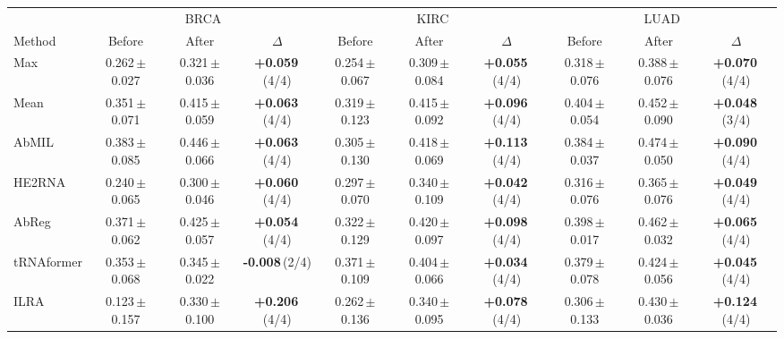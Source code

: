 \begin{tabular}{lccccccccc}
\toprule
& \multicolumn{3}{c}{BRCA} & \multicolumn{3}{c}{KIRC} & \multicolumn{3}{c}{LUAD}\\
\cmidrule(lr){2-4}\cmidrule(lr){5-7}\cmidrule(lr){8-10}
Method & Before & After & $\Delta$ & Before & After & $\Delta$ & Before & After & $\Delta$\\
\midrule
Max & 0.262\,{\tiny$\pm$0.027} & 0.321\,{\tiny$\pm$0.036} & \textbf{+0.059}\,{\tiny(4/4)} & 0.254\,{\tiny$\pm$0.067} & 0.309\,{\tiny$\pm$0.084} & \textbf{+0.055}\,{\tiny(4/4)} & 0.318\,{\tiny$\pm$0.076} & 0.388\,{\tiny$\pm$0.076} & \textbf{+0.070}\,{\tiny(4/4)}\\
Mean & 0.351\,{\tiny$\pm$0.071} & 0.415\,{\tiny$\pm$0.059} & \textbf{+0.063}\,{\tiny(4/4)} & 0.319\,{\tiny$\pm$0.123} & 0.415\,{\tiny$\pm$0.092} & \textbf{+0.096}\,{\tiny(4/4)} & 0.404\,{\tiny$\pm$0.054} & 0.452\,{\tiny$\pm$0.090} & \textbf{+0.048}\,{\tiny(3/4)}\\
AbMIL & 0.383\,{\tiny$\pm$0.085} & 0.446\,{\tiny$\pm$0.066} & \textbf{+0.063}\,{\tiny(4/4)} & 0.305\,{\tiny$\pm$0.130} & 0.418\,{\tiny$\pm$0.069} & \textbf{+0.113}\,{\tiny(4/4)} & 0.384\,{\tiny$\pm$0.037} & 0.474\,{\tiny$\pm$0.050} & \textbf{+0.090}\,{\tiny(4/4)}\\
HE2RNA & 0.240\,{\tiny$\pm$0.065} & 0.300\,{\tiny$\pm$0.046} & \textbf{+0.060}\,{\tiny(4/4)} & 0.297\,{\tiny$\pm$0.070} & 0.340\,{\tiny$\pm$0.109} & \textbf{+0.042}\,{\tiny(4/4)} & 0.316\,{\tiny$\pm$0.076} & 0.365\,{\tiny$\pm$0.076} & \textbf{+0.049}\,{\tiny(4/4)}\\
AbReg & 0.371\,{\tiny$\pm$0.062} & 0.425\,{\tiny$\pm$0.057} & \textbf{+0.054}\,{\tiny(4/4)} & 0.322\,{\tiny$\pm$0.129} & 0.420\,{\tiny$\pm$0.097} & \textbf{+0.098}\,{\tiny(4/4)} & 0.398\,{\tiny$\pm$0.017} & 0.462\,{\tiny$\pm$0.032} & \textbf{+0.065}\,{\tiny(4/4)}\\
tRNAformer & 0.353\,{\tiny$\pm$0.068} & 0.345\,{\tiny$\pm$0.022} & \textbf{-0.008}\,{\tiny(2/4)} & 0.371\,{\tiny$\pm$0.109} & 0.404\,{\tiny$\pm$0.066} & \textbf{+0.034}\,{\tiny(4/4)} & 0.379\,{\tiny$\pm$0.078} & 0.424\,{\tiny$\pm$0.056} & \textbf{+0.045}\,{\tiny(4/4)}\\
ILRA & 0.123\,{\tiny$\pm$0.157} & 0.330\,{\tiny$\pm$0.100} & \textbf{+0.206}\,{\tiny(4/4)} & 0.262\,{\tiny$\pm$0.136} & 0.340\,{\tiny$\pm$0.095} & \textbf{+0.078}\,{\tiny(4/4)} & 0.306\,{\tiny$\pm$0.133} & 0.430\,{\tiny$\pm$0.036} & \textbf{+0.124}\,{\tiny(4/4)}\\

\end{tabular}
